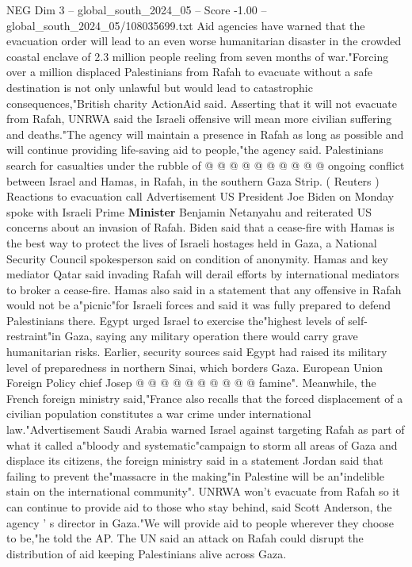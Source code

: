 \begin{textsample}{NEG Dim 3 – global\_south\_2024\_05 – Score -1.00 – global\_south\_2024\_05/108035699.txt}
Aid agencies have warned that the evacuation order will lead to an even worse humanitarian disaster in the crowded coastal enclave of 2.3 million people reeling from seven months of war."Forcing over a million displaced Palestinians from Rafah to evacuate without a safe destination is not only unlawful but would lead to catastrophic consequences,"British charity ActionAid said.
Asserting that it will not evacuate from Rafah, UNRWA said the Israeli offensive will mean more civilian suffering and deaths."The agency will maintain a presence in Rafah as long as possible and will continue providing life-saving aid to people,"the agency said.
Palestinians search for casualties under the rubble of @ @ @ @ @ @ @ @ @ @ ongoing conflict between Israel and Hamas, in Rafah, in the southern Gaza Strip. ( Reuters ) Reactions to evacuation call Advertisement US President Joe Biden on Monday spoke with Israeli Prime \textbf{Minister} Benjamin Netanyahu and reiterated US concerns about an invasion of Rafah.
Biden said that a cease-fire with Hamas is the best way to protect the lives of Israeli hostages held in Gaza, a National Security Council spokesperson said on condition of anonymity.
Hamas and key mediator Qatar said invading Rafah will derail efforts by international mediators to broker a cease-fire.
Hamas also said in a statement that any offensive in Rafah would not be a"picnic"for Israeli forces and said it was fully prepared to defend Palestinians there.
Egypt urged Israel to exercise the"highest levels of self-restraint"in Gaza, saying any military operation there would carry grave humanitarian risks.
Earlier, security sources said Egypt had raised its military level of preparedness in northern Sinai, which borders Gaza.
European Union Foreign Policy chief Josep @ @ @ @ @ @ @ @ @ @ famine".
Meanwhile, the French foreign ministry said,"France also recalls that the forced displacement of a civilian population constitutes a war crime under international law."Advertisement Saudi Arabia warned Israel against targeting Rafah as part of what it called a"bloody and systematic"campaign to storm all areas of Gaza and displace its citizens, the foreign ministry said in a statement Jordan said that failing to prevent the"massacre in the making"in Palestine will be an"indelible stain on the international community".
UNRWA won't evacuate from Rafah so it can continue to provide aid to those who stay behind, said Scott Anderson, the agency ' s director in Gaza."We will provide aid to people wherever they choose to be,"he told the AP.
The UN said an attack on Rafah could disrupt the distribution of aid keeping Palestinians alive across Gaza.

\end{textsample}
